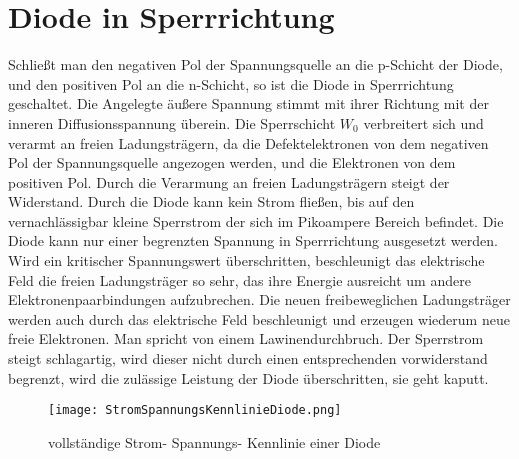 \section{Diode in Sperrrichtung}
Schließt man den negativen Pol der Spannungsquelle an die p-Schicht der Diode, und den positiven Pol an die n-Schicht, so ist die Diode in Sperrrichtung geschaltet. Die Angelegte äußere Spannung stimmt mit ihrer Richtung mit der inneren Diffusionsspannung überein. Die Sperrschicht $W_{0}$ verbreitert sich und verarmt an freien Ladungsträgern, da die Defektelektronen von dem negativen Pol der Spannungsquelle angezogen werden, und die Elektronen von dem positiven Pol. Durch die Verarmung an freien Ladungsträgern steigt der Widerstand. Durch die Diode kann kein Strom fließen, bis auf den vernachlässigbar kleine Sperrstrom der sich im Pikoampere Bereich befindet. Die Diode kann nur einer begrenzten Spannung in Sperrrichtung ausgesetzt werden. Wird ein kritischer Spannungswert überschritten, beschleunigt das elektrische Feld die freien Ladungsträger so sehr, das ihre Energie ausreicht um andere Elektronenpaarbindungen aufzubrechen. Die neuen freibeweglichen Ladungsträger werden auch durch das elektrische Feld beschleunigt und erzeugen wiederum neue freie Elektronen. Man spricht von einem Lawinendurchbruch. Der Sperrstrom steigt schlagartig, wird dieser nicht durch einen entsprechenden vorwiderstand begrenzt, wird die zulässige Leistung der Diode überschritten, sie geht kaputt. 

\begin{figure}[!htb]
\centering
\texttt{[image: StromSpannungsKennlinieDiode.png]}
\caption{vollständige Strom- Spannungs- Kennlinie einer Diode \cite{Stiny2018}}
\end{figure}

